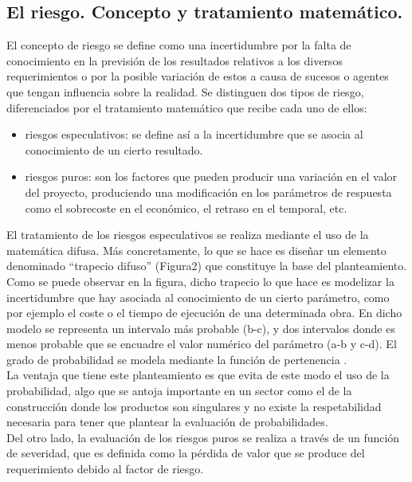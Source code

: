\documentclass[10pt]{article}
\begin{document}
\subsection{El riesgo. Concepto y tratamiento matemático.}

El concepto de riesgo se define como una incertidumbre por la falta de conocimiento en la previsión de los resultados relativos a los diversos requerimientos o por la posible variación de estos a causa de sucesos o agentes que tengan influencia sobre la realidad. Se distinguen dos tipos de riesgo, diferenciados por el tratamiento matemático que recibe cada uno de ellos:

\begin{itemize}

	\item riesgos especulativos: se define así a la incertidumbre que se asocia al conocimiento de un cierto resultado.
	
	\item riesgos puros: son los factores que pueden producir una variación en el valor del proyecto, produciendo una modificación en los parámetros de respuesta como el sobrecoste en el económico, el retraso en el temporal, etc.

\end{itemize}


El tratamiento de los riesgos especulativos se realiza mediante el uso de la matemática difusa. Más concretamente, lo que se hace es diseñar un elemento denominado “trapecio difuso” (Figura2) que constituye la base del planteamiento. Como se puede observar en la figura, dicho trapecio lo que hace es modelizar la incertidumbre que hay asociada al conocimiento de un cierto parámetro, como por ejemplo el coste o el tiempo de ejecución de una determinada obra. En dicho modelo se representa un intervalo más probable (b-c), y dos intervalos donde es menos probable que se encuadre el valor numérico del parámetro (a-b y c-d). El grado de probabilidad se modela mediante la función de pertenencia .\\

	La ventaja que tiene este planteamiento es que evita de este modo el uso de la probabilidad, algo que se antoja importante en un sector como el de la construcción donde los productos son singulares y no existe la respetabilidad necesaria para tener que plantear la evaluación de probabilidades.\\
	
	Del otro lado, la evaluación de los riesgos puros se realiza a través de un función de severidad, que es definida como la pérdida de valor que se produce del requerimiento debido al factor de riesgo. \\
\end{document}
